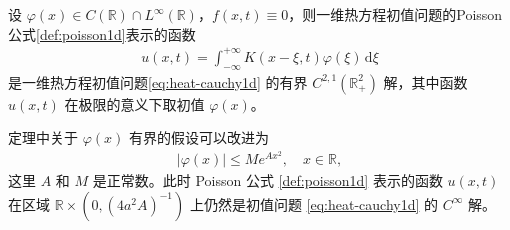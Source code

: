 \documentclass[../../main.tex]{subfiles}%
\begin{document}
\begin{theorem}
设 $\varphi(x)\in C(\mathbb{R})\cap L^\infty(\mathbb{R})$，$f(x,t)\equiv 0$，则一维热方程初值问题的Poisson公式\eqref{def:poisson1d}表示的函数
\begin{align*}
u(x,t)=\int_{-\infty}^{+\infty}K(x-\xi,t)\varphi(\xi)\,\mathrm{d}\xi
\end{align*}
是一维热方程初值问题\eqref{eq:heat-cauchy1d} 的有界 $C^{2,1}(\mathbb{R}_+^2)$ 解，其中函数 $u(x,t)$ 在极限的意义下取初值 $\varphi(x)$。
\end{theorem}
\begin{remark}
定理中关于 $\varphi(x)$ 有界的假设可以改进为
\begin{align*}
|\varphi(x)|\leqslant Me^{Ax^2},\quad x\in\mathbb{R},
\end{align*}
这里 $A$ 和 $M$ 是正常数。此时 Poisson 公式 \eqref{def:poisson1d} 表示的函数 $u(x,t)$ 在区域 $\mathbb{R}\times(0,(4a^2A)^{-1})$ 上仍然是初值问题 \eqref{eq:heat-cauchy1d} 的 $C^\infty$ 解。
\end{remark}
\end{document}

